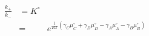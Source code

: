 \begin{eqnarray}\label{eqn:equilibrium-constant}
\frac{k_+}{k_-} & =  K^\circ \\
 &  = & e^{\frac{1}{RT}\left(\gamma_C\mu_C^\circ+ \gamma_D\mu_D^\circ -\gamma_A\mu_A^\circ-\gamma_B\mu_B^\circ\right)} \\
\end{eqnarray}